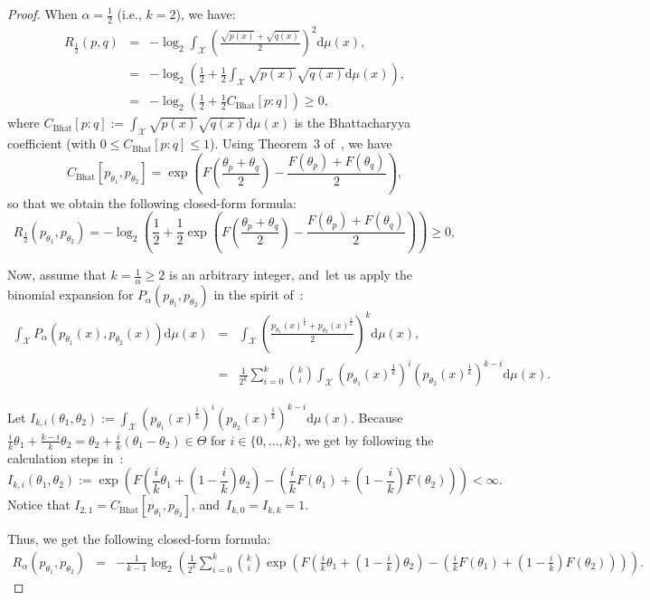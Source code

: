 \documentclass[entropy,article,accept,oneauthor,pdftex,entropy]{Definitions/mdpi}
\def\Bhat{\mathrm{Bhat}}
\def\dmu{\mathrm{d}\mu}
\def\calX{\mathcal{X}}
\def\dmu{\mathrm{d}\mu}
\begin{document}
\begin{paracol}{2}
\begin{proof}
When $\alpha=\frac{1}{2}$ (i.e., $k=2$), we have:
\begin{eqnarray}
R_{\frac{1}{2}}(p,q) &=& -\log_2 \int_\calX \left(\frac{ \sqrt{p(x)}+ \sqrt{q(x)}}{2}\right)^{2} \dmu(x),\\ 
&=& -\log_2 \left(\frac{1}{2}+ \frac{1}{2}\int_\calX \sqrt{p(x)}\sqrt{q(x)}\dmu(x)\right),\\
&=& -\log_2 \left(\frac{1}{2}+ \frac{1}{2} C_{\Bhat}[p:q]\right) \geq 0,
\end{eqnarray}
where $C_{\Bhat}[p:q]:=\int_\calX \sqrt{p(x)}\sqrt{q(x)}\dmu(x)$  is the Bhattacharyya coefficient (with $0 \leq C_{\Bhat}[p:q]\leq 1$). Using Theorem~3 of~\cite{BR-2011}, we have
$$
C_{\Bhat}[p_{\theta_1},p_{\theta_2}]=\exp\left( F\left(\frac{\theta_p+\theta_q}{2}\right) - \frac{F(\theta_p)+F(\theta_q)}{2}\right),
$$
so that we obtain the following closed-form formula:
$$
R_{\frac{1}{2}}(p_{\theta_1},p_{\theta_2}) = -\log_2 \left(\frac{1}{2}+ \frac{1}{2} \exp\left( F\left(\frac{\theta_p+\theta_q}{2}\right) - \frac{F(\theta_p)+F(\theta_q)}{2}\right) \right) \geq 0,
$$

Now, assume that $k=\frac{1}{\alpha}\geq 2$ is an arbitrary integer, and~let us apply the binomial expansion for $P_\alpha(p_{\theta_1},p_{\theta_2})$ in the spirit of~\cite{fdivchiorder-2013,MinkowskiDiv-2019}:
\begin{eqnarray}
\int_\calX P_\alpha(p_{\theta_1}(x),p_{\theta_2}(x)) \dmu(x) &=& \int_\calX   \left( \frac{ p_{\theta_1}(x)^{\frac{1}{k}}+ p_{\theta_2}(x)^{\frac{1}{k}}}{2}\right)^{k} \dmu(x),\\
&=& \frac{1}{2^k} \sum_{i=0}^k \binom{k}{i} \int_\calX  \left( p_{\theta_1}(x)^{\frac{1}{k}} \right)^i
 \left( p_{\theta_2}(x)^{\frac{1}{k}}\right)^{k-i} \dmu(x).
\end{eqnarray}

Let $I_{k,i}(\theta_1,\theta_2):=\int_\calX  \left(p_{\theta_1}(x)^{\frac{1}{k}}\right)^i \left(p_{\theta_2}(x)^{\frac{1}{k}}\right)^{k-i} \dmu(x)$.
Because $\frac{i}{k}\theta_1+\frac{k-i}{k}\theta_2=\theta_2+\frac{i}{k}(\theta_1-\theta_2)\in\Theta$ for $i\in\{0,\ldots, k\}$,  we get by following the calculation steps in~\cite{BR-2011}:
$$
I_{k,i}(\theta_1,\theta_2):=\exp\left(F\left(\frac{i}{k}\theta_1+\left(1-\frac{i}{k}\right)\theta_2\right)-\left(\frac{i}{k}F(\theta_1)+\left(1-\frac{i}{k}\right)F(\theta_2)\right)\right)<\infty.
$$
Notice that $I_{2,1}=C_{\Bhat}[p_{\theta_1},p_{\theta_2}]$, and~$I_{k,0}=I_{k,k}=1$.

Thus, we get the following closed-form formula:
\begingroup\makeatletter\def\f@size{7.2}\check@mathfonts
\def\maketag@@@#1{\hbox{\m@th\normalsize\normalfont#1}}%
\begin{eqnarray}
R_\alpha(p_{\theta_1},p_{\theta_2})&=&-\frac{1}{k-1}\log_2 \left( \frac{1}{2^k} \sum_{i=0}^k \binom{k}{i}  \exp\left(F\left(\frac{i}{k}\theta_1+\left(1-\frac{i}{k}\right)\theta_2\right)-\left(\frac{i}{k}F(\theta_1)+\left(1-\frac{i}{k}\right)F(\theta_2)\right)\right) \right).
\end{eqnarray}
\endgroup
\end{proof}


\end{paracol}
\end{document}
